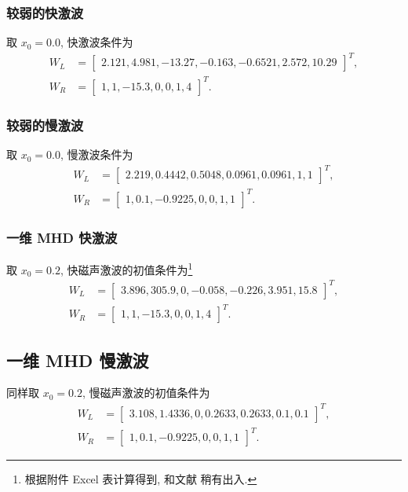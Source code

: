 \documentclass[10.5pt
]{article}
\begin{document}
\subsubsection{较弱的快激波}
取 $x_0 = 0.0$, 快激波条件为
\begin{align}
W_L &= \left[\begin{array}{cccccc}
2.121,
4.981,
-13.27,
-0.163,
-0.6521,
2.572,
10.29
\end{array}\right]^T,
\nonumber\\
W_R &= \left[\begin{array}{ccccccc}
1,
1,
-15.3,
0,
0,
1,
4
\end{array}\right]^T. \label{Eqn:WFast}
\end{align}

\subsubsection{较弱的慢激波}
取 $x_0 = 0.0$, 慢激波条件为
\begin{align}
W_L &= \left[\begin{array}{ccccccc}
2.219,
0.4442,
0.5048,
0.0961,
0.0961,
1,
1
\end{array}\right]^T,
\nonumber\\
W_R &= \left[\begin{array}{ccccccc}
1,
0.1,
-0.9225,
0,
0,
1,
1
\end{array}\right]^T.\label{Eqn:WSlow}
\end{align}

\subsubsection{一维 MHD 快激波}
取 $x_0 = 0.2$, 快磁声激波的初值条件为\footnote{
  根据附件 Excel 表计算得到, 和文献 \citet{Dai1994} 稍有出入.
}
\begin{align}
W_L &= \left[\begin{array}{cccccc}
3.896,
305.9,
0,
-0.058,
-0.226,
3.951,
15.8
\end{array}\right]^T,
\nonumber\\
W_R &= \left[\begin{array}{ccccccc}
1,
1,
-15.3,
0,
0,
1,
4
\end{array}\right]^T.\label{Eqn:Fast}
\end{align}

\subsection{一维 MHD 慢激波}
同样取 $x_0 = 0.2$, 慢磁声激波的初值条件为
\begin{align}
W_L &= \left[\begin{array}{ccccccc}
3.108,
1.4336,
0,
0.2633,
0.2633,
0.1,
0.1
\end{array}\right]^T,
\nonumber\\
W_R &= \left[\begin{array}{ccccccc}
1,
0.1,
-0.9225,
0,
0,
1,
1
\end{array}\right]^T.\label{Eqn:Slow}
\end{align}
\end{document}
